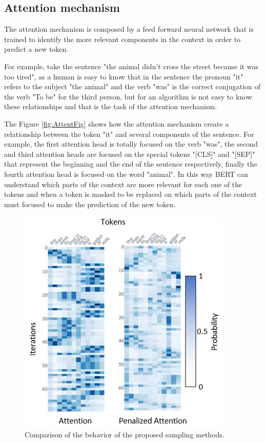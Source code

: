 \documentclass[10pt,twocolumn,letterpaper]{article}
\begin{document}
\subsection{Attention mechanism}
The attention mechanism is composed by a feed forward neural network that is trained to
identify the more relevant components in the context in order to predict a new token.

For example, take the sentence "the animal didn't cross the street because it was too tired",
as a human is easy to know that in the sentence the pronoun "it" refers to the subject "the animal"
and the verb "was" is the correct conjugation of the verb "To be" for the third person, but for an
algorithm is not easy to know these relationships and that is the task of the attention mechanism.

The Figure \ref{fig:AttentFig}  shows how the attention mechanism create a relationship between the token "it" and several components
of the sentence.
For example, the first attention head is totally focused on the verb "was", the second and third
attention heads are focused on the special tokens "[CLS]" and "[SEP]" that represent the beginning and the end of
the sentence respectively, finally the fourth attention head is focused on the word "animal".
In this way BERT can understand which parts of the context are more relevant for each one of the tokens and when a token
is masked to be replaced on which parts of the context must focused to make the prediction of the new token.

\begin{figure}
   \centering
   \includegraphics[scale=1]{attComp.PNG}
   \caption{Comparison of the behavior of the proposed sampling methods.}
   \label{fig:AttentComp}
\end{figure}
\end{document}
